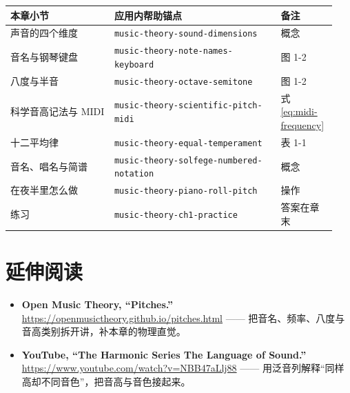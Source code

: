 \begin{center}
\small
\setlength{\tabcolsep}{3pt}
\begin{longtable}{p{0.30\linewidth}p{0.48\linewidth}p{0.16\linewidth}}
\toprule
本章小节 & 应用内帮助锚点 & 备注 \\
\midrule
\endhead
声音的四个维度 & \texttt{music-theory-sound-dimensions} & 概念 \\
音名与钢琴键盘 & \texttt{music-theory-note-names-keyboard} & 图 1-2 \\
八度与半音 & \texttt{music-theory-octave-semitone} & 图 1-2 \\
科学音高记法与 MIDI & \texttt{music-theory-scientific-pitch-midi} & 式 \eqref{eq:midi-frequency} \\
十二平均律 & \texttt{music-theory-equal-temperament} & 表 1-1 \\
音名、唱名与简谱 & \texttt{music-theory-solfege-numbered-notation} & 概念 \\
在夜半里怎么做 & \texttt{music-theory-piano-roll-pitch} & 操作 \\
练习 & \texttt{music-theory-ch1-practice} & 答案在章末 \\
\bottomrule
\end{longtable}
\end{center}

\section*{延伸阅读}
\begin{itemize}
  \item \textbf{Open Music Theory, “Pitches.”} \url{https://openmusictheory.github.io/pitches.html} —— 把音名、频率、八度与音高类别拆开讲，补本章的物理直觉。
  \item \textbf{YouTube, “The Harmonic Series \textbar{} The Language of Sound.”} \url{https://www.youtube.com/watch?v=NBB47aLlj88} —— 用泛音列解释“同样高却不同音色”，把音高与音色接起来。
\end{itemize}

